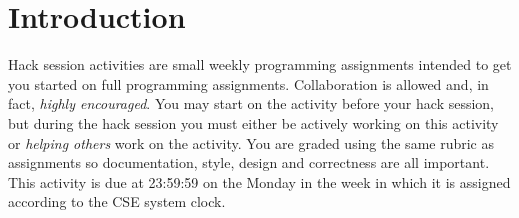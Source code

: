 \section*{Introduction}

Hack session activities are small weekly programming assignments intended
to get you started on full programming assignments.  Collaboration is allowed
and, in fact, \emph{highly encouraged}.  You may start on the activity before
your hack session, but during the hack session you must either be actively 
working on this activity or \emph{helping others} work on the activity.
You are graded using the same rubric as assignments so documentation, style, 
design and correctness are all important.  This activity is due at 23:59:59
on the Monday in the week in which it is assigned according to the CSE system
clock.


